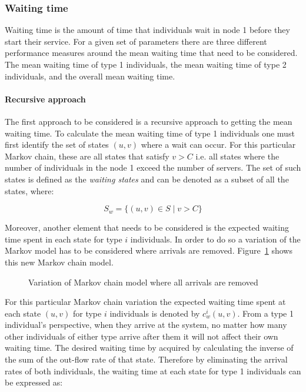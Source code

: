 \subsubsection{Waiting time}\label{sec:waiting_time}
Waiting time is the amount of time that individuals wait in node 1 before
they start their service.
For a given set of parameters there are three different performance measures
around the mean waiting time that need to be considered.
The mean waiting time of type 1 individuals, the mean waiting time of type 2
individuals, and the overall mean waiting time.

\paragraph{Recursive approach}\label{sec:recursive_waiting_time}

The first approach to be considered is a recursive approach to getting the
mean waiting time.
To calculate the mean waiting time of type 1 individuals one must first
identify the set of states \((u, v)\) where a wait can occur.
For this particular Markov chain, these are all states that satisfy \(v > C\)
i.e. all states where the number of individuals in the node 1 exceed
the number of servers.
The set of such states is defined as the \textit{waiting states} and can be
denoted as a subset of all the states, where:

\begin{equation} \label{eq:waiting_states}
    S_w = \{(u, v) \in S \; | \; v > C \}
\end{equation}

Moreover, another element that needs to be considered is the expected waiting
time spent in each state for type \(i\) individuals.
In order to do so a variation of the Markov model has to be considered where
arrivals are removed.
Figure~\ref{fig:markov_variation_no_arrivals} shows this new Markov chain model.

\begin{figure}[h]
    \centering
    
    \caption{Variation of Markov chain model where all arrivals are removed}
    \label{fig:markov_variation_no_arrivals}
\end{figure}

For this particular Markov chain variation the expected waiting time spent at
each state \((u,v)\) for type \(i\) individuals is denoted by \(c_w^i(u,v)\).
From a type 1 individual's perspective, when they arrive at the system, no
matter how many other individuals of either type arrive after them it will not
affect their own waiting time.
The desired waiting time by acquired by calculating the inverse of the sum of
the out-flow rate of that state.
Therefore by eliminating the arrival rates of both individuals, the waiting time
at each state for type 1 individuals can be expressed as:

